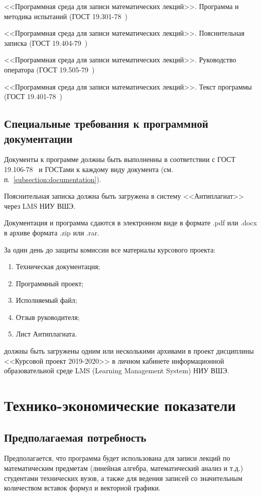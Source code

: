 \documentclass[techtask]{espd}
\begin{document}
<<Программная среда для записи математических лекций>>. Программа и методика испытаний (ГОСТ 19.301-78~\cite{espd301})

<<Программная среда для записи математических лекций>>. Пояснительная записка (ГОСТ 19.404-79~\cite{espd404})

<<Программная среда для записи математических лекций>>. Руководство оператора (ГОСТ 19.505-79~\cite{espd505})

<<Программная среда для записи математических лекций>>. Текст программы (ГОСТ 19.401-78~\cite{espd401})

\subsection{Специальные требования к программной документации}\label{subsection:docspec}
Документы к программе должны быть выполненны в соответствии с ГОСТ 19.106-78~\cite{espd106} и ГОСТами к каждому виду документа (см. п.~\ref{subsection:documentation}).

Пояснительная записка должна быть загружена в систему <<Антиплагиат>> через LMS НИУ ВШЭ.

Документация и программа сдаются в электронном виде в формате .pdf или .docx в архиве формата .zip или .rar.

За один день до защиты комиссии все материалы курсового проекта:
\begin{enumerate}
\item Техническая документация;
\item Программный проект;
\item Исполняемый файл;
\item Отзыв руководителя;
\item Лист Антиплагиата.
\end{enumerate}
должны быть загружены одним или несколькими архивами в проект дисциплины <<Курсовой проект 2019-2020>> в личном кабинете информационной образовательной среде LMS (Learning Management System) НИУ ВШЭ.

\section{Технико-экономические показатели}
\subsection{Предполагаемая потребность}
Предполагается, что программа будет использована для записи лекций по математическим предметам (линейная алгебра, математический анализ и т.д.) студентами технических вузов, а также для ведения записей со значительным количеством вставок формул и векторной графики.
\end{document}
